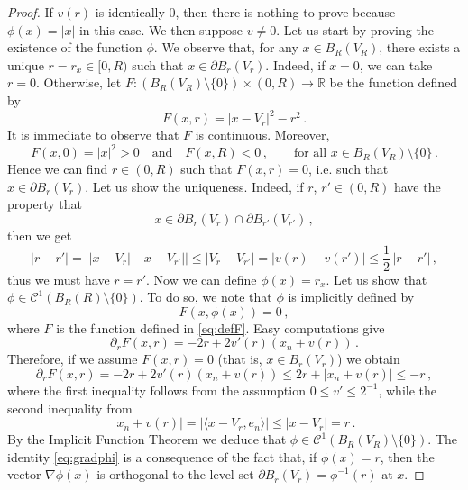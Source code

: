 \documentclass[a4paper,reqno,11pt]{amsart}
\newcommand{\R}{\mathbb{R}}
\newcommand{\de}{\partial}
\newcommand{\cC}{\mathcal{C}}
\begin{document}
\begin{proof}
If $v(r)$ is identically $0$, then there is nothing to prove because $\phi(x) = |x|$ in this case. We then suppose $v \neq 0$. Let us start by proving the existence of the function $\phi$. We observe that, for any $x \in B_{R}(V_R)$, there exists a unique $r = r_{x} \in [0,R)$ such that $x \in \de B_{r}(V_r)$. Indeed, if $x = 0$, we can take $r = 0$. Otherwise, let $F: (B_{R}(V_R) \setminus \{ 0 \}) \times (0,R) \rightarrow \R$ be the function defined by
\begin{equation} \label{eq:defF}
F(x,r) = |x - V_r|^{2} - r^{2} \, .
\end{equation}
It is immediate to observe that $F$ is continuous. Moreover,
\begin{equation*}
F(x,0) = |x|^{2} > 0 \quad\text{and}\quad F(x,R) < 0 \, , \qquad \text{for all } x \in B_{R}(V_R) \setminus \{ 0 \} \, .
\end{equation*}
Hence we can find $r \in (0,R)$ such that $F(x,r) = 0$, i.e. such that $x \in \de B_{r}(V_r)$. Let us show the uniqueness. Indeed, if $r$, $r' \in (0,R)$ have the property that
\begin{equation*}
x \in \de B_{r}(V_r) \cap \de B_{r'}(V_{r'}) \, ,
\end{equation*}
then we get
\begin{equation*}
|r - r'| = ||x - V_r| - |x - V_{r'}|| \leq |V_r - V_{r'}| = |v(r) - v(r')| \leq \dfrac{1}{2} \, |r - r'| \, ,
\end{equation*}
thus we must have $r = r'$. Now we can define $\phi(x) = r_{x}$. Let us show that $\phi \in \cC^{1}(B_{R}(R) \setminus \{ 0 \})$. To do so, we note that $\phi$ is implicitly defined by
\begin{equation*} %
F(x, \phi(x)) = 0 \, ,
\end{equation*}
where $F$ is the function defined in \eqref{eq:defF}. Easy computations give
\begin{equation*}
\de_{r} F(x,r) = -2r + 2 v'(r)(x_{n} + v(r)) \, .
\end{equation*}
Therefore, if we assume $F(x,r) = 0$ (that is, $x \in B_{r}(V_r)$) we obtain
\begin{equation*}
\de_{r} F (x,r) = -2r + 2 v'(r)(x_{n} + v(r)) \leq 2r + |x_{n} + v(r)| \leq -r \, ,
\end{equation*}
where the first inequality follows from the assumption $0 \leq v' \leq 2^{-1}$, while the second inequality from
\begin{equation*}
|x_{n} + v(r)| = |\langle x - V_r , e_{n} \rangle| \leq |x - V_r| = r \, .
\end{equation*}
By the Implicit Function Theorem we deduce that $\phi \in \cC^{1}(B_{R}(V_R) \setminus \{ 0 \})$. The identity \eqref{eq:gradphi} is a consequence of the fact that, if $\phi(x) = r$, then the vector $\nabla \phi(x)$ is orthogonal to the level set $\de B_{r}(V_r) = \phi^{-1}(r)$ at $x$. 


\end{proof}
\end{document}
